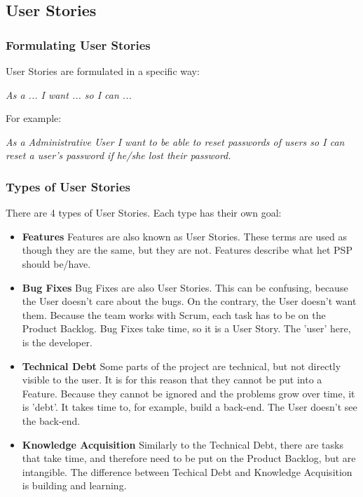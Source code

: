 \documentclass[10pt]{report}
\begin{document}
\subsection{User Stories}

\subsubsection{Formulating User Stories}

User Stories are formulated in a specific way:

\emph{As a ... I want ... so I can ...}

For example:

\emph{As a Administrative User I want to be able to reset passwords of users so I can reset a user's password if he/she lost their password.}

\subsubsection{Types of User Stories}

There are 4 types of User Stories. Each type has their own goal:

\begin{itemize}
	\item \textbf{Features} Features are also known as User Stories. These terms are used as though they are the same, but they are not. Features describe what het PSP should be/have.
	\item \textbf{Bug Fixes} Bug Fixes are also User Stories. This can be confusing, because the User doesn't care about the bugs. On the contrary, the User doesn't want them. Because the team works with Scrum, each task has to be on the Product Backlog. Bug Fixes take time, so it is a User Story. The 'user' here, is the developer.
	\item \textbf{Technical Debt} Some parts of the project are technical, but not directly visible to the user. It is for this reason that they cannot be put into a Feature. Because they cannot be ignored and the problems grow over time, it is 'debt'. It takes time to, for example, build a back-end. The User doesn't see the back-end.
	\item \textbf{Knowledge Acquisition} Similarly to the Technical Debt, there are tasks that take time, and therefore need to be put on the Product Backlog, but are intangible. The difference between Techical Debt and Knowledge Acquisition is building and learning.
\end{itemize}
\end{document}
